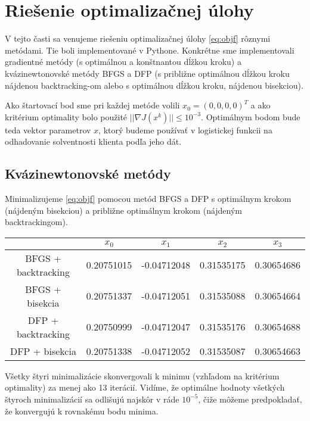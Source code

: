\documentclass[report.tex]{subfiles}
\begin{document}
   

\section{Riešenie optimalizačnej úlohy}\label{sec:CD}

V tejto časti sa venujeme riešeniu optimalizačnej úlohy \ref{eq:objf} rôznymi metódami. Tie boli implementované v Pythone. Konkrétne sme implementovali gradientné metódy (s optimálnou a konštnantou dĺžkou kroku) a kvázinewtonovské metódy BFGS a DFP (s približne optimálnou dĺžkou kroku nájdenou backtracking-om alebo s optimálnou dĺžkou kroku, nájdenou bisekciou). 

Ako štartovací bod sme pri každej metóde volili $x_0 = (0,0,0,0)^T$ a ako kritérium optimality bolo použité $||\nabla J(x^k)|| \leq 10^{-3}$. Optimálnym bodom bude teda vektor parametrov $x$, ktorý budeme používať v logistickej funkcii na odhadovanie solventnosti klienta podľa jeho dát.
	

\subsection{Kvázinewtonovské metódy}

Minimalizujeme \ref{eq:objf} pomocou metód BFGS a DFP s optimálnym krokom (nájdeným bisekciou) a približne optimálnym krokom (nájdeným backtrackingom).

\begin{center}
	\small
	\begin{tabular}{| c | c  c  c  c |}
		\hline
		 & $x_0$ & $x_1$ & $x_2$ & $x_3$ \\
		\hline
		BFGS + backtracking & 0.20751015 & -0.04712048 & 0.31535175 & 0.30654686 \\
		BFGS + bisekcia & 0.20751337 & -0.04712051 & 0.31535088 & 0.30654664 \\
		DFP + backtracking & 0.20750999 & -0.04712047 & 0.31535176 & 0.30654688 \\
		DFP + bisekcia & 0.20751338 & -0.04712052 & 0.31535087 & 0.30654663 \\
		\hline
	\end{tabular}
\end{center}

Všetky štyri minimalizácie skonvergovali k minimu (vzhľadom na kritérium optimality) za menej ako 13 iterácií. Vidíme, že optimálne hodnoty všetkých štyroch minimalizácií sa odlišujú najskôr v ráde $10^{-5}$, čiže môžeme predpokladať, že konvergujú k rovnakému bodu minima.
\end{document}
